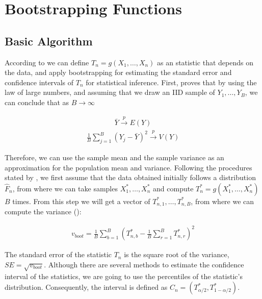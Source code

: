 \documentclass[11pt]{article}
\begin{document}
\section{Bootstrapping Functions}\label{sec:bootstrapping-functions}

\subsection{Basic Algorithm}\label{subsec:basic-algorithm}

According to \cite{LW04} we can define $T_n = g(X_1, \dots, X_n)$ as an statistic that depends on the data, and apply
bootstrapping for estimating the standard error and confidence intervals of $T_n$ for statistical inference. First,
\cite{LW04} proves that by using the law of large numbers, and assuming that we draw an IID sample of $Y_1, \dots, Y_B$,
we can conclude that as $B \rightarrow \infty$

\begin{align}
    \bar{Y} \overset{p}{\to} E(Y)
\end{align}
\begin{align}
    \frac{1}{B} \sum_{j=1}^{B}{(Y_j - \bar{Y})^{2}} \overset{p}{\to} V(Y)
\end{align}

Therefore, we can use the sample mean and the sample variance as an approximation for the population mean and variance.
Following the procedures stated by \cite{LW04}, we first assume that the data obtained initially follows a distribution
$\hat{F}_n$, from where we can take samples $X_{1}^{*}, \dots, X_{n}^{*}$ and compute $T_{n}^{*} = g(X_{1}^{*}, \dots, X_{n}^{*})$
$B$ times. From this step we will get a vector of $T_{n,1}^{*}, \dots, T_{n,B}^{*}$, from where we can compute the variance
(\cite{LW04}):

\begin{align}
v_{boot} = \frac{1}{B}\sum_{b=1}^{B}{\left( T_{n,b}^{*} - \frac{1}{B} \sum_{r=1}^{B}{T_{n,r}^{*}} \right)^2}
\end{align}

The standard error of the statistic $T_n$ is the square root of the variance, $SE = \sqrt{v_{boot}}$. Although there are
several methods to estimate the confidence interval of the statistics, we are going to use the percentiles of the statistic's
distribution. Consequently, the interval is defined as $C_n = \left(T_{\alpha/2}^{*},T_{1 - \alpha/2}^{*}\right)$.

\medskip
\end{document}
